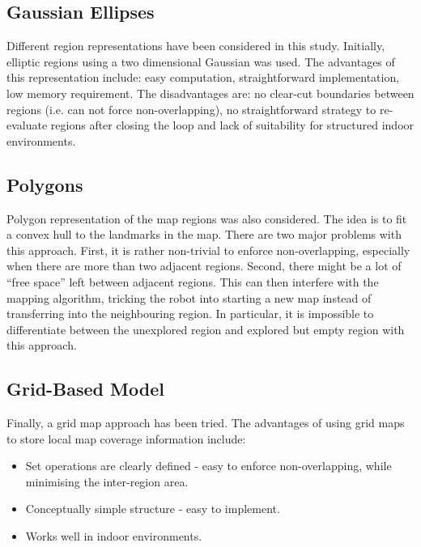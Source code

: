 \subsection{Gaussian Ellipses}

Different region representations have been considered in this study.
Initially, elliptic regions using a two dimensional Gaussian was used.
The advantages of this representation include: easy computation,
straightforward implementation, low memory requirement. The disadvantages
are: no clear-cut boundaries between regions (i.e. can not force
non-overlapping), no straightforward strategy to re-evaluate regions
after closing the loop and lack of suitability for structured indoor
environments.

\subsection{Polygons}

Polygon representation of the map regions was also considered. The
idea is to fit a convex hull to the landmarks in the map. There are
two major problems with this approach. First, it is rather non-trivial
to enforce non-overlapping, especially when there are more than two
adjacent regions. Second, there might be a lot of ``free space'' left
between adjacent regions. This can then interfere with the mapping
algorithm, tricking the robot into starting a new map instead of
transferring into the neighbouring region.  In particular, it is
impossible to differentiate between the unexplored region and explored
but empty region with this approach.

\subsection{Grid-Based Model}

Finally, a grid map approach has been tried. The advantages of using
grid maps to store local map coverage information include:

\begin{itemize}
\item Set operations are clearly defined - easy to enforce
non-overlapping, while minimising the inter-region area.

\item Conceptually simple structure - easy to implement.

\item Works well in indoor environments.
\end{itemize}

